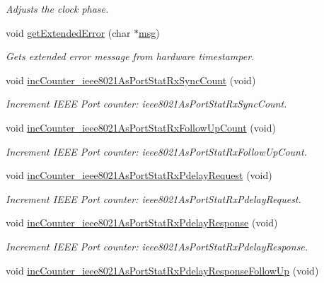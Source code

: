 \begin{DoxyCompactItemize}
\begin{DoxyCompactList}\small\item\em Adjusts the clock phase. \end{DoxyCompactList}\item 
void \hyperlink{class_common_port_a8bcdf3d304abf916ea33264ef3e5af39}{get\+Extended\+Error} (char $\ast$\hyperlink{openavb__log_8c_a0c7e58a50354c4a4d6dad428d0e47029}{msg})
\begin{DoxyCompactList}\small\item\em Gets extended error message from hardware timestamper. \end{DoxyCompactList}\item 
void \hyperlink{class_common_port_a82bc733c03001e7714cd1226ff4cbfda}{inc\+Counter\+\_\+ieee8021\+As\+Port\+Stat\+Rx\+Sync\+Count} (void)
\begin{DoxyCompactList}\small\item\em Increment I\+E\+EE Port counter\+: ieee8021\+As\+Port\+Stat\+Rx\+Sync\+Count. \end{DoxyCompactList}\item 
void \hyperlink{class_common_port_acfa4a67632219499ba332b29dad2235c}{inc\+Counter\+\_\+ieee8021\+As\+Port\+Stat\+Rx\+Follow\+Up\+Count} (void)
\begin{DoxyCompactList}\small\item\em Increment I\+E\+EE Port counter\+: ieee8021\+As\+Port\+Stat\+Rx\+Follow\+Up\+Count. \end{DoxyCompactList}\item 
void \hyperlink{class_common_port_a3373adc8433a95b24a895472a6c89cff}{inc\+Counter\+\_\+ieee8021\+As\+Port\+Stat\+Rx\+Pdelay\+Request} (void)
\begin{DoxyCompactList}\small\item\em Increment I\+E\+EE Port counter\+: ieee8021\+As\+Port\+Stat\+Rx\+Pdelay\+Request. \end{DoxyCompactList}\item 
void \hyperlink{class_common_port_a6942efdfd632f8da83e8e5089f4a3ba1}{inc\+Counter\+\_\+ieee8021\+As\+Port\+Stat\+Rx\+Pdelay\+Response} (void)
\begin{DoxyCompactList}\small\item\em Increment I\+E\+EE Port counter\+: ieee8021\+As\+Port\+Stat\+Rx\+Pdelay\+Response. \end{DoxyCompactList}\item 
void \hyperlink{class_common_port_a616fe4534facbdb2d3e5296d5a787923}{inc\+Counter\+\_\+ieee8021\+As\+Port\+Stat\+Rx\+Pdelay\+Response\+Follow\+Up} (void)

\end{DoxyCompactItemize}
